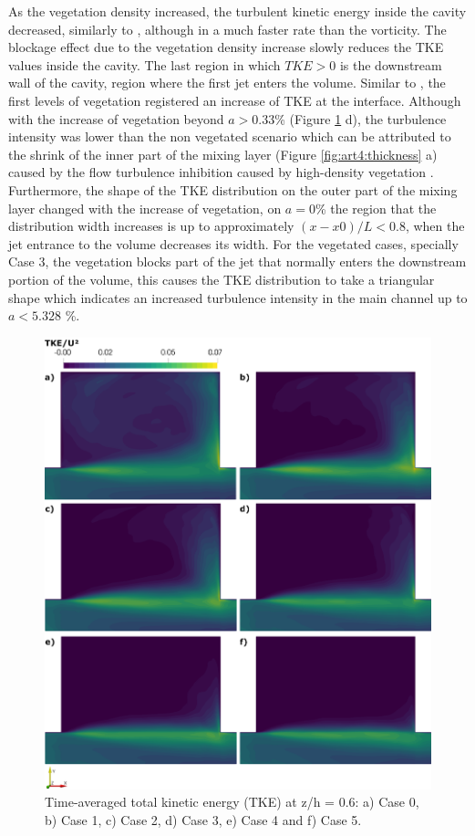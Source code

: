 As the vegetation density increased, the turbulent kinetic energy inside the cavity decreased, similarly to \textcite{xiang2019}, although in a much faster rate than the vorticity. The blockage effect due to the vegetation density increase slowly reduces the TKE values inside the cavity. The last region in which $TKE > 0$ is the downstream wall of the cavity, region where the first jet enters the volume. Similar to \textcite{xiang2019}, the first levels of vegetation registered an increase of TKE at the interface. Although with the increase of vegetation beyond $a > 0.33$\% (Figure \ref{fig:art4:totalTKEMean1} d), the turbulence intensity was lower than the non vegetated scenario which can be attributed to the shrink of the inner part of the mixing layer (Figure \ref{fig:art4:thickness} a) caused by the flow turbulence inhibition caused by high-density vegetation \cite{Nepf2012}. Furthermore, the shape of the TKE distribution on the outer part of the mixing layer changed with the increase of vegetation, on $a = 0$\% the region that the distribution width increases is up to approximately $(x-x0)/L < 0.8$, when the jet entrance to the volume decreases its width. For the vegetated cases, specially Case 3, the vegetation blocks part of the jet that normally enters the downstream portion of the volume, this causes the TKE distribution to take a triangular shape which indicates an increased turbulence intensity in the main channel up to $a < 5.328$ \%.

\begin{figure}[!ht]
\centering
\includegraphics[width=\linewidth]{../images/art4/totalTKEMean1.jpeg}
\caption{Time-averaged total kinetic energy (TKE) at z/h = 0.6: a) Case 0, b) Case 1, c) Case 2, d) Case 3, e) Case 4 and f) Case 5.}
\label{fig:art4:totalTKEMean1}
\end{figure}

